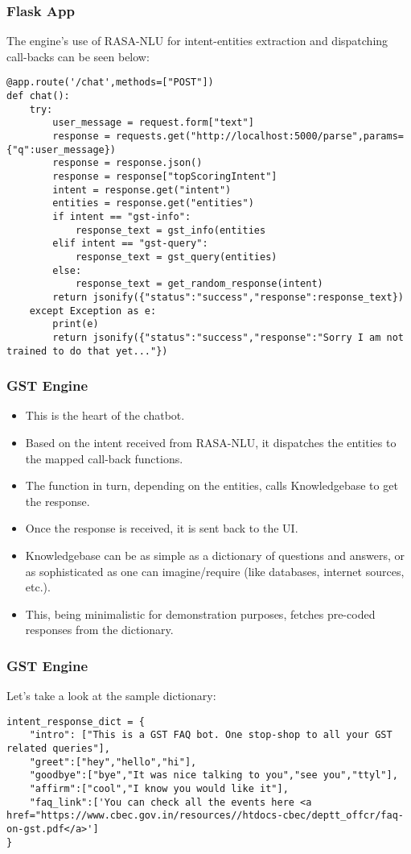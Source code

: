  \begin{frame}[fragile]\frametitle{Flask App}
The engine’s use of RASA-NLU for intent-entities extraction and dispatching call-backs can be seen below:
\scriptsize
\begin{lstlisting}
@app.route('/chat',methods=["POST"])
def chat():
    try:
        user_message = request.form["text"]
        response = requests.get("http://localhost:5000/parse",params={"q":user_message})
        response = response.json()
        response = response["topScoringIntent"]
        intent = response.get("intent")
        entities = response.get("entities")
        if intent == "gst-info":
            response_text = gst_info(entities
        elif intent == "gst-query":
            response_text = gst_query(entities)
        else:
            response_text = get_random_response(intent)
        return jsonify({"status":"success","response":response_text})
    except Exception as e:
        print(e)
        return jsonify({"status":"success","response":"Sorry I am not trained to do that yet..."})
\end{lstlisting}
\end{frame}

 \begin{frame}[fragile]\frametitle{GST Engine}
\begin{itemize}
\item This is the heart of the chatbot. 
\item Based on the intent received from RASA-NLU, it dispatches the entities to the mapped call-back functions. 
\item The function in turn, depending on the entities, calls Knowledgebase to get the response. 
\item Once the response is received, it is sent back to the UI.
\item Knowledgebase can be as simple as a dictionary of questions and answers, or as sophisticated as one can imagine/require (like databases, internet sources, etc.). 
\item This, being minimalistic for demonstration purposes, fetches pre-coded responses from the dictionary.
\end{itemize}

\end{frame}

 \begin{frame}[fragile]\frametitle{GST Engine}
 Let's take a look at the sample dictionary:

\scriptsize
\begin{lstlisting}
intent_response_dict = {
    "intro": ["This is a GST FAQ bot. One stop-shop to all your GST related queries"],
    "greet":["hey","hello","hi"],
    "goodbye":["bye","It was nice talking to you","see you","ttyl"],
    "affirm":["cool","I know you would like it"],
    "faq_link":['You can check all the events here <a href="https://www.cbec.gov.in/resources//htdocs-cbec/deptt_offcr/faq-on-gst.pdf</a>']
}
\end{lstlisting}
\end{frame}

